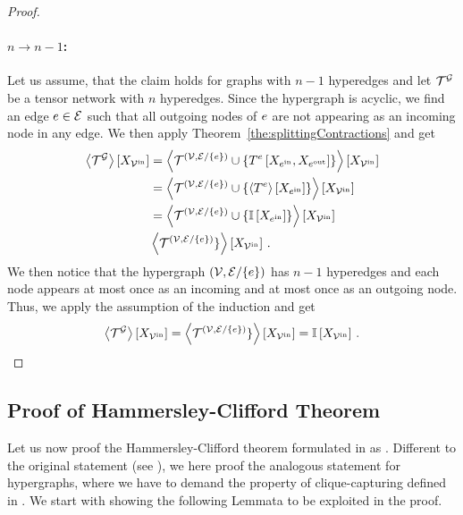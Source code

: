 \begin{proof}
    \paragraph{$n\rightarrow n-1$:} Let us assume, that the claim holds for graphs with $n-1$ hyperedges and let $\mathcal{T}^{\mathcal{G}}$ be a tensor network with $n$ hyperedges.
    Since the hypergraph is acyclic, we find an edge $e\in\mathcal{E}$ such that all outgoing nodes of $e$ are not appearing as an incoming node in any edge.
    We then apply Theorem~\ref{the:splittingContractions} and get
    \begin{align*}
        \left\langle \mathcal{T}^{\mathcal{G}}\right\rangle \left[ X_{\mathcal{V}^{\mathrm{in}}} \right]
        &= \left\langle 
            \mathcal{T}^{(\mathcal{V},\mathcal{E}/\{e\})} \cup \{T^{e}\left[X_{e^{\mathrm{in}}},X_{e^{\mathrm{out}}}\right]\}
        \right\rangle \left[ X_{\mathcal{V}^{\mathrm{in}}} \right] \\
        & = \left\langle 
            \mathcal{T}^{(\mathcal{V},\mathcal{E}/\{e\})} \cup \{\left\langle T^{e}\right\rangle \left[ X_{e^{\mathrm{in}}} \right] \}
        \right\rangle \left[ X_{\mathcal{V}^{\mathrm{in}}} \right] \\
        & = \left\langle 
            \mathcal{T}^{(\mathcal{V},\mathcal{E}/\{e\})} \cup \{\mathbb{I}\left[X_{e^{\mathrm{in}}}\right] \}
        \right\rangle \left[ X_{\mathcal{V}^{\mathrm{in}}} \right] \\
        & \left\langle 
            \mathcal{T}^{(\mathcal{V},\mathcal{E}/\{e\})} \}
        \right\rangle \left[ X_{\mathcal{V}^{\mathrm{in}}} \right] \, .
    \end{align*}
    We then notice that the hypergraph $(\mathcal{V},\mathcal{E}/\{e\})$ has $n-1$ hyperedges and each node appears at most once as an incoming and at most once as an outgoing node.
    Thus, we apply the assumption of the induction and get
    \begin{align*}
        \left\langle \mathcal{T}^{\mathcal{G}}\right\rangle \left[ X_{\mathcal{V}^{\mathrm{in}}} \right] = \left\langle 
            \mathcal{T}^{(\mathcal{V},\mathcal{E}/\{e\})} \}
        \right\rangle \left[ X_{\mathcal{V}^{\mathrm{in}}} \right] = \mathbb{I}\left[X_{\mathcal{V}^{\mathrm{in}}}\right] \, .
    \end{align*}
\end{proof}


\subsection{Proof of Hammersley-Clifford Theorem}\label{sec:proofHCTheorem}

Let us now proof the Hammersley-Clifford theorem formulated in  as .
Different to the original statement (see \cite{hammersley_markov_1971}), we here proof the analogous statement for hypergraphs, where we have to demand the property of clique-capturing defined in .
We start with showing the following Lemmata to be exploited in the proof.

